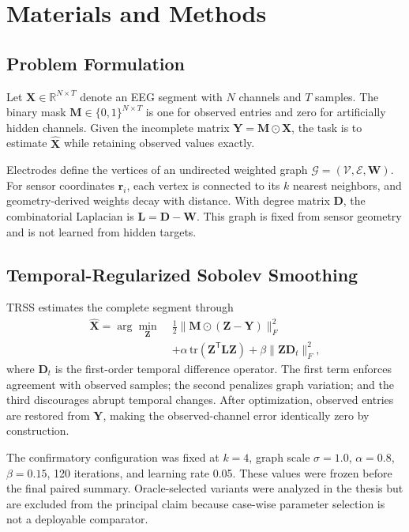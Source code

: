 \section{Materials and Methods}
\subsection{Problem Formulation}
Let $\bm{X}\in\mathbb{R}^{N\times T}$ denote an EEG segment with $N$ channels and $T$ samples. The binary mask $\bm{M}\in\{0,1\}^{N\times T}$ is one for observed entries and zero for artificially hidden channels. Given the incomplete matrix $\bm{Y}=\bm{M}\odot\bm{X}$, the task is to estimate $\widehat{\bm{X}}$ while retaining observed values exactly.

Electrodes define the vertices of an undirected weighted graph $\mathcal{G}=(\mathcal{V},\mathcal{E},\bm{W})$. For sensor coordinates $\bm{r}_i$, each vertex is connected to its $k$ nearest neighbors, and geometry-derived weights decay with distance. With degree matrix $\bm{D}$, the combinatorial Laplacian is $\bm{L}=\bm{D}-\bm{W}$. This graph is fixed from sensor geometry and is not learned from hidden targets.

\subsection{Temporal-Regularized Sobolev Smoothing}
TRSS estimates the complete segment through
\begin{equation}
\begin{split}
\widehat{\bm{X}}=\arg\min_{\bm{Z}}\;&
\frac{1}{2}\lVert\bm{M}\odot(\bm{Z}-\bm{Y})\rVert_F^2 \\
&+\alpha\,\mathrm{tr}(\bm{Z}^{\mathsf T}\bm{L}\bm{Z})
+\beta\lVert\bm{Z}\bm{D}_t\rVert_F^2,
\end{split}
\label{eq:trss}
\end{equation}
where $\bm{D}_t$ is the first-order temporal difference operator. The first term enforces agreement with observed samples; the second penalizes graph variation; and the third discourages abrupt temporal changes. After optimization, observed entries are restored from $\bm{Y}$, making the observed-channel error identically zero by construction.

The confirmatory configuration was fixed at $k=4$, graph scale $\sigma=1.0$, $\alpha=0.8$, $\beta=0.15$, 120 iterations, and learning rate 0.05. These values were frozen before the final paired summary. Oracle-selected variants were analyzed in the thesis but are excluded from the principal claim because case-wise parameter selection is not a deployable comparator.

